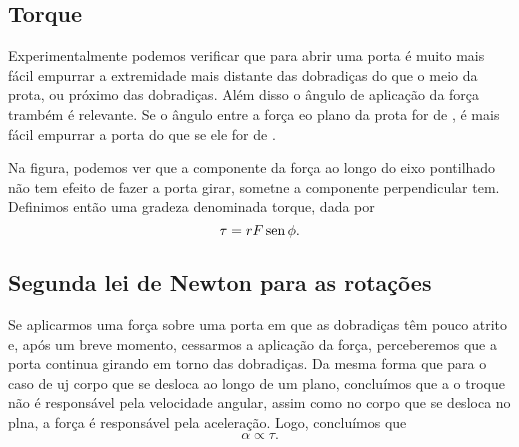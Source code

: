 \subsection{Torque}

Experimentalmente podemos verificar que para abrir uma porta é muito mais fácil empurrar a extremidade mais distante das dobradiças do que o meio da prota, ou próximo das dobradiças. Além disso o ângulo de aplicação da força trambém é relevante. Se o ângulo entre a força eo plano da prota for de , é mais fácil empurrar a porta do que se ele for de .


Na figura, podemos ver que a componente da força ao longo do eixo pontilhado não tem efeito de fazer a porta girar, sometne a componente perpendicular tem. Definimos então uma gradeza denominada torque, dada por
\begin{equation}\label{Eq:DefModTorque}
	\tau = r F \operatorname{sen}\phi.
\end{equation}


\subsection{Segunda lei de Newton para as rotações}

Se aplicarmos uma força sobre uma porta em que as dobradiças têm pouco atrito e, após um breve momento, cessarmos a aplicação da força, perceberemos que a porta continua girando em torno das dobradiças. Da mesma forma que para o caso de uj corpo que se desloca ao longo de um plano, concluímos que a o troque não é responsável pela velocidade angular, assim como no corpo que se desloca no plna, a força é responsável pela aceleração. Logo, concluímos que
\begin{equation}
	\alpha \propto \tau.
\end{equation}

